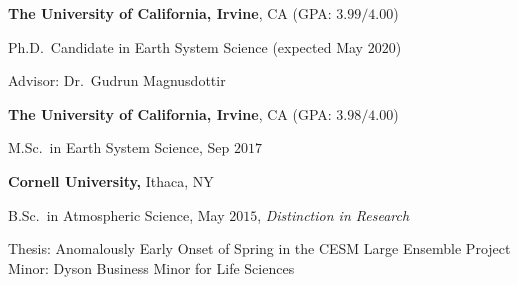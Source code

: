 \documentclass[margin,line,palatino,courier,10pt]{res}
\newenvironment{list1}{
  \begin{list}{\ding{113}}{%
      \setlength{\itemsep}{0in}
      \setlength{\parsep}{0in} \setlength{\parskip}{0in}
      \setlength{\topsep}{0in} \setlength{\partopsep}{0in}
      \setlength{\leftmargin}{0.17in}}}{\end{list}}
\begin{document}
\begin{resume}
{\bf The University of California, Irvine}, CA (GPA: $3.99/4.00$)\\
\vspace*{-.12in}
\begin{list1}
\item[] Ph.D.~Candidate in Earth System Science (expected May $2020$)

\hspace*{0.2in} Advisor: Dr.\ Gudrun Magnusdottir
\end{list1}

{\bf The University of California, Irvine}, CA (GPA: $3.98/4.00$)\\
\vspace*{-.12in}
\begin{list1}
\item[] M.Sc.~in Earth System Science, Sep $2017$
\end{list1}

{\bf Cornell University,} Ithaca, NY\\
\vspace*{-.12in}
\begin{list1}
\item[] B.Sc.~in Atmospheric Science, May $2015$, \textit{Distinction in Research}

\hspace{0.2in}  Thesis: Anomalously Early Onset of Spring in the CESM Large Ensemble Project\\
\hspace*{0.2in}  Minor: Dyson Business Minor for Life Sciences

\end{list1}


\end{resume}
\end{document}
